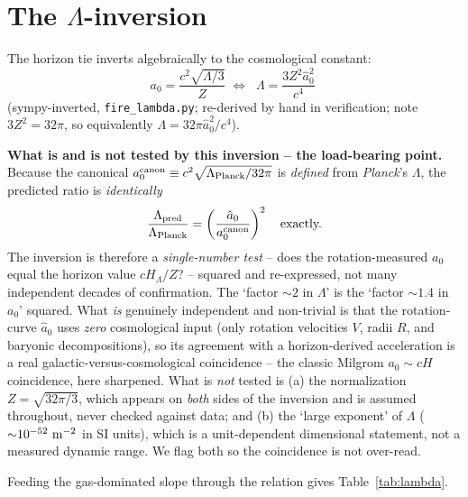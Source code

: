 \documentclass[fleqn,usenatbib]{mnras}
\begin{document}

\section{The $\Lambda$-inversion}
\label{sec:inversion}

The horizon tie inverts algebraically to the cosmological constant:
\begin{equation}
a_0=\frac{c^2\sqrt{\Lambda/3}}{Z}\;\Longleftrightarrow\;\boxed{\;\Lambda=\frac{3Z^2\hat a_0^2}{c^4}\;}
\label{eq:inversion}
\end{equation}
(sympy-inverted, \texttt{fire\_lambda.py}; re-derived by hand in verification; note $3Z^2=32\pi$, so equivalently $\Lambda=32\pi\hat a_0^2/c^4$).

\textbf{What is and is not tested by this inversion -- the load-bearing point.} Because the canonical $a_0^{\rm canon}\equiv c^2\sqrt{\Lambda_{\rm Planck}/32\pi}$ is \emph{defined} from \textit{Planck}'s $\Lambda$, the predicted ratio is \emph{identically}
\begin{equation}
\frac{\Lambda_{\rm pred}}{\Lambda_{\rm Planck}}=\left(\frac{\hat a_0}{a_0^{\rm canon}}\right)^2\quad\text{exactly.}
\label{eq:ratio}
\end{equation}
The inversion is therefore a \emph{single-number test} -- does the rotation-measured $a_0$ equal the horizon value $cH_\Lambda/Z$? -- squared and re-expressed, not many independent decades of confirmation. The `factor ${\sim}2$ in $\Lambda$' is the `factor ${\sim}1.4$ in $a_0$' squared. What \emph{is} genuinely independent and non-trivial is that the rotation-curve $\hat a_0$ uses \emph{zero} cosmological input (only rotation velocities $V$, radii $R$, and baryonic decompositions), so its agreement with a horizon-derived acceleration is a real galactic-versus-cosmological coincidence -- the classic Milgrom $a_0\sim cH$ coincidence, here sharpened. What is \emph{not} tested is (a) the normalization $Z=\sqrt{32\pi/3}$, which appears on \emph{both} sides of the inversion and is assumed throughout, never checked against data; and (b) the `large exponent' of $\Lambda$ (${\sim}10^{-52}\ {\rm m^{-2}}$ in SI units), which is a unit-dependent dimensional statement, not a measured dynamic range. We flag both so the coincidence is not over-read.

Feeding the gas-dominated slope through the relation gives Table~\ref{tab:lambda}.
\end{document}
